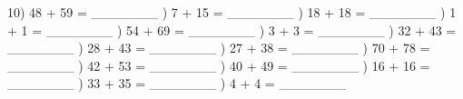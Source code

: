 \documentclass{article}%
\begin{document}
10) 48 + 59 = \_\_\_\_\_\_\_%
\newline%
\newline%
) 7 + 15 = \_\_\_\_\_\_\_%
\newline%
\newline%
) 18 + 18 = \_\_\_\_\_\_\_%
\newline%
\newline%
) 1 + 1 = \_\_\_\_\_\_\_%
\newline%
\newline%
) 54 + 69 = \_\_\_\_\_\_\_%
\newline%
\newline%
) 3 + 3 = \_\_\_\_\_\_\_%
\newline%
\newline%
) 32 + 43 = \_\_\_\_\_\_\_%
\newline%
\newline%
) 28 + 43 = \_\_\_\_\_\_\_%
\newline%
\newline%
) 27 + 38 = \_\_\_\_\_\_\_%
\newline%
\newline%
) 70 + 78 = \_\_\_\_\_\_\_%
\newline%
\newline%
) 42 + 53 = \_\_\_\_\_\_\_%
\newline%
\newline%
) 40 + 49 = \_\_\_\_\_\_\_%
\newline%
\newline%
) 16 + 16 = \_\_\_\_\_\_\_%
\newline%
\newline%
) 33 + 35 = \_\_\_\_\_\_\_%
\newline%
\newline%
) 4 + 4 = \_\_\_\_\_\_\_%
\newline%
\newline%
\end{document}

